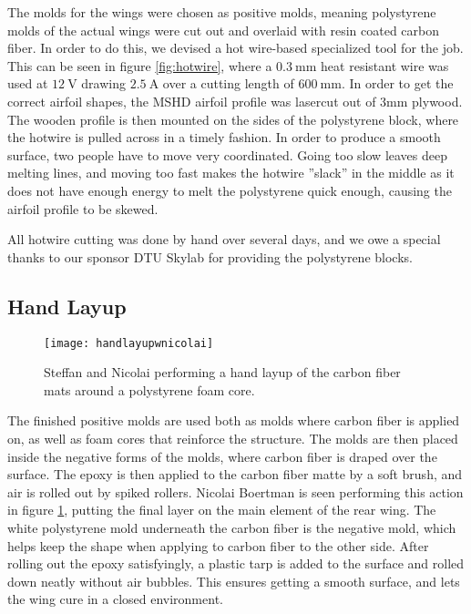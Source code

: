   The molds for the wings were chosen as positive molds, meaning polystyrene molds of the actual wings were cut out and overlaid with resin coated carbon fiber. In order to do this, we devised a hot wire-based specialized tool for the job. This can be seen in figure \ref{fig:hotwire}, where a $\SI{0.3}{\milli\metre}$ heat resistant
   wire was used at $\SI{12}{\volt}$ drawing $\SI{2.5}{\ampere}$ over a cutting length of $\SI{600}{\milli\metre}$. In order to get the correct airfoil shapes, the MSHD airfoil profile was lasercut out of 3mm plywood. The wooden profile is then mounted on the sides of the polystyrene block, where the hotwire is pulled across in a timely fashion. In order to produce a smooth surface, two people have to move very coordinated. Going too slow leaves deep melting lines, and moving too fast makes the hotwire ''slack'' in the middle as it does not have enough energy to melt the polystyrene quick enough, causing the airfoil profile to be skewed.

  All hotwire cutting was done by hand over several days, and we owe a special thanks to our sponsor DTU Skylab for providing the polystyrene blocks.

  \subsection{Hand Layup}

    \begin{figure}
      \texttt{[image: handlayupwnicolai]}
      \caption{Steffan and Nicolai performing a hand layup of the carbon fiber mats around a polystyrene foam core.}
      \label{fig:handlayup}
    \end{figure}

    The finished positive molds are used both as molds where carbon fiber is applied on, as well as foam cores that reinforce the structure. The molds are then placed inside the negative forms of the molds, where carbon fiber is draped over the surface. The epoxy is then applied to the carbon fiber matte by a soft brush, and air is rolled out by spiked rollers. Nicolai Boertman is seen performing this action in figure \ref{fig:handlayup}, putting the final layer on the main element of the rear wing. The white polystyrene mold underneath the carbon fiber is the negative mold, which helps keep the shape when applying to carbon fiber to the other side. After rolling out the epoxy satisfyingly, a plastic tarp is added to the surface and rolled down neatly without air bubbles. This ensures getting a smooth surface, and lets the wing cure in a closed environment.

